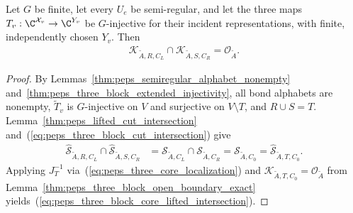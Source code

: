 \begin{lemma}%
    \label{thm:peps_three_block_core_lifted_intersection}
    \leanok
    Let $G$ be finite, let every $U_e$ be semi-regular, and let the three
    maps $T_v:\C^{\mathcal X_v}\to\C^{Y_v}$ be $G$-injective for their
    incident representations, with finite, independently chosen $Y_v$.
    Then
    \begin{align}
        \mathcal K_{\widetilde A,R,C_L}\cap
        \mathcal K_{\widetilde A,S,C_R}=\mathcal O_{\widetilde A}.
        \label{eq:peps_three_block_core_lifted_intersection}
    \end{align}
\end{lemma}
\begin{proof}\leanok
    By Lemmas~\ref{thm:peps_semiregular_alphabet_nonempty}
    and~\ref{thm:peps_three_block_extended_injectivity}, all bond alphabets are
    nonempty, $\widetilde T_v$ is $G$-injective on $V$ and surjective on
    $V\setminus T$, and $R\cup S=T$. Lemma~\ref{thm:peps_lifted_cut_intersection}
    and~(\ref{eq:peps_three_block_cut_intersection}) give
    \begin{align}
        \widehat{\mathcal S}_{\widetilde A,R,C_L}\cap
        \widehat{\mathcal S}_{\widetilde A,S,C_R}
         & =\mathcal S_{\widetilde A,C_L}\cap\mathcal S_{\widetilde A,C_R}
        =\mathcal S_{\widetilde A,C_0}
        =\widehat{\mathcal S}_{\widetilde A,T,C_0}.
        \label{eq:peps_three_block_lifted_reduction}
    \end{align}
    Applying $J_T^{-1}$ via~(\ref{eq:peps_three_core_localization}) and
    $\mathcal K_{\widetilde A,T,C_0}=\mathcal O_{\widetilde A}$ from
    Lemma~\ref{thm:peps_three_block_open_boundary_exact} yields~(\ref{eq:peps_three_block_core_lifted_intersection}).
\end{proof}

